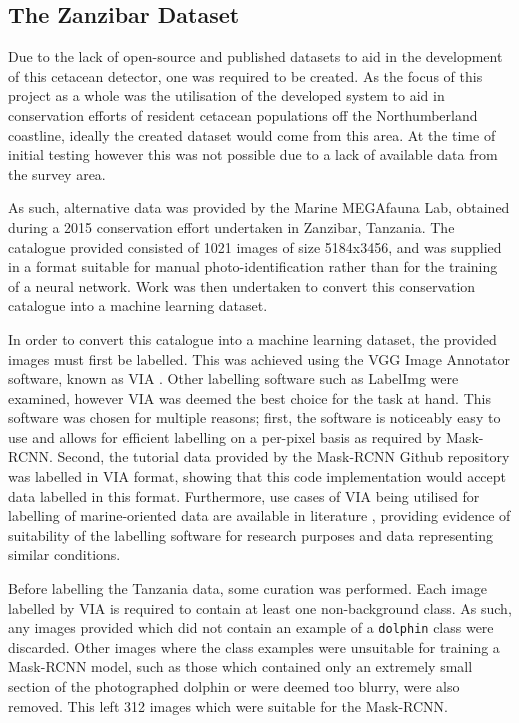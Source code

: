 \subsection{The Zanzibar Dataset}\label{ch:cetDet,sec:initialTesting,sub:zanzibar}

Due to the lack of open-source and published datasets to aid in the development of this cetacean detector, one was required to be created. As the focus of this project as a whole was the utilisation of the developed system to aid in conservation efforts of resident cetacean populations off the Northumberland coastline, ideally the created dataset would come from this area. At the time of initial testing however this was not possible due to a lack of available data from the survey area.

As such, alternative data was provided by the Marine MEGAfauna Lab, obtained during a 2015 conservation effort undertaken in Zanzibar, Tanzania. The catalogue provided consisted of 1021 images of size 5184x3456, and was supplied in a format suitable for manual photo-identification rather than for the training of a neural network. Work was then undertaken to convert this conservation catalogue into a machine learning dataset. 

In order to convert this catalogue into a machine learning dataset, the provided images must first be labelled. This was achieved using the VGG Image Annotator software, known as VIA \cite{dutta_via_2019}. Other labelling software such as LabelImg \cite{tzutalin_labelimg_2021} were examined, however VIA was deemed the best choice for the task at hand. This software was chosen for multiple reasons; first, the software is noticeably easy to use and allows for efficient labelling on a per-pixel basis as required by Mask-RCNN. Second, the tutorial data provided by the Mask-RCNN Github repository was labelled in VIA format, showing that this code implementation would accept data labelled in this format. Furthermore, use cases of VIA being utilised for labelling of marine-oriented data are available in literature \cite{nita_cnn-based_2020}, providing evidence of suitability of the labelling software for research purposes and data representing similar conditions.

Before labelling the Tanzania data, some curation was performed. Each image labelled by VIA is required to contain at least one non-background class. As such, any images provided which did not contain an example of a \texttt{dolphin} class were discarded. Other images where the class examples were unsuitable for training a Mask-RCNN model, such as those which contained only an extremely small section of the photographed dolphin or were deemed too blurry, were also removed. This left 312 images which were suitable for the Mask-RCNN.

